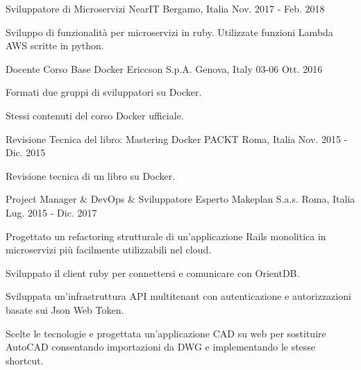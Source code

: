 \begin{cventries}
  \cventry
    {Sviluppatore di Microservizi} %
    {NearIT} %
    {Bergamo, Italia} %
    {Nov. 2017 - Feb. 2018} %
    {
      \begin{cvitems} %
        \item {Sviluppo di funzionalità per microservizi in ruby. Utilizzate funzioni Lambda AWS scritte in python.}
      \end{cvitems}
    }

  \cventry
    {Docente Corso Base Docker} %
    {Ericcson S.p.A.} %
    {Genova, Italy} %
    {03-06 Ott. 2016} %
    {
      \begin{cvitems} %
        \item {Formati due gruppi di sviluppatori su Docker.}
        \item {Stessi contenuti del corso Docker ufficiale.}
      \end{cvitems}
    }

  \cventry
    {Revisione Tecnica del libro: Mastering Docker} %
    {PACKT} %
    {Roma, Italia} %
    {Nov. 2015 - Dic. 2015} %
    {
      \begin{cvitems} %
        \item {Revisione tecnica di un libro su Docker.}
      \end{cvitems}
    }

  \cventry
    {Project Manager \& DevOps \& Sviluppatore Esperto} %
    {Makeplan S.a.s.} %
    {Roma, Italia} %
    {Lug. 2015 - Dic. 2017} %
    {
      \begin{cvitems} %
        \item {Progettato un refactoring strutturale di un'applicazione Rails monolitica in microservizi più facilmente utilizzabili nel cloud.}
        \item {Sviluppato il client ruby per connettersi e comunicare con OrientDB.}
        \item {Sviluppata un'infrastruttura API multitenant con autenticazione e autorizzazioni basate sui Json Web Token.}
        \item {Scelte le tecnologie e progettata un'applicazione CAD su web per sostituire AutoCAD consentando importazioni da DWG e implementando le stesse shortcut.}
      \end{cvitems}
    }


\end{cventries}
